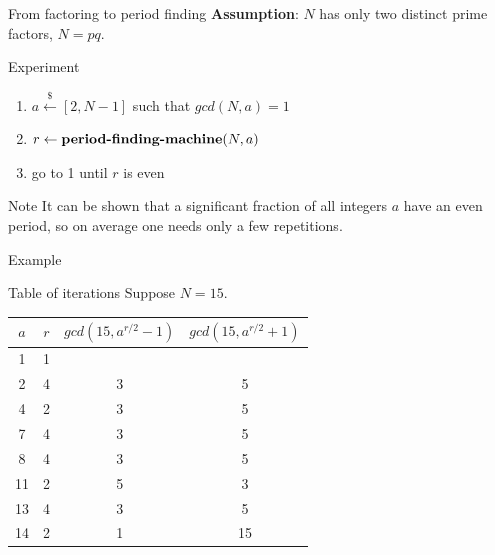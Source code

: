 \documentclass{beamer}
\begin{document}
    \begin{frame}{From factoring to period finding}
        \textbf{Assumption}: $N$ has only two distinct prime factors, $N = pq$.
        \vspace{0.5cm} 
        \begin{alertblock}{Experiment}
            \begin{enumerate}
                \item $a \overset{\$}{\leftarrow} [2, N-1]$ such that $gcd(N,a) = 1$
                \item $r \leftarrow \text{\textbf{period-finding-machine}}(N,a)$
                \item go to 1 until $r$ is even
            \end{enumerate}
        \end{alertblock}
        \vspace{0.5cm} 
        \begin{block}{Note}
            It can be shown that a significant fraction of all integers $a$ have
            an even period, so on average one needs only a few repetitions.
        \end{block}
    \end{frame}
    \begin{frame}{Example}
        \begin{exampleblock}{Table of iterations}
            Suppose $N = 15$.
            \begin{center}
                \begin{tabular}{ |c|c|c|c| } 
                    \hline
                    $a$ & $r$ & $gcd(15, a^{r/2} - 1)$ & $gcd(15, a^{r/2} + 1)$ \\ 
                    \hline
                    1 & 1 & & \\ 
                    \hline
                    2 & 4 & 3 & 5 \\ 
                    \hline
                    4 & 2 & 3 & 5 \\
                    \hline
                    7 & 4 & 3 & 5 \\
                    \hline
                    8 & 4 & 3 & 5 \\
                    \hline
                    11 & 2 & 5 & 3 \\
                    \hline
                    13 & 4 & 3 & 5 \\
                    \hline
                    14 & 2 & 1 & 15 \\
                    \hline
                \end{tabular}
            \end{center}
        \end{exampleblock}
    \end{frame}
\end{document}

